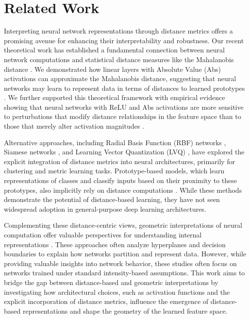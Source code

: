 \section{Related Work}
\label{sec:related_work}

Interpreting neural network representations through distance metrics offers a promising avenue for enhancing their interpretability and robustness. Our recent theoretical work has established a fundamental connection between neural network computations and statistical distance measures like the Mahalanobis distance \cite{mahalanobis1936generalized}. We demonstrated how linear layers with Absolute Value (Abs) activations can approximate the Mahalanobis distance, suggesting that neural networks may learn to represent data in terms of distances to learned prototypes \cite{oursland2024interpreting}. We further supported this theoretical framework with empirical evidence showing that neural networks with ReLU and Abs activations are more sensitive to perturbations that modify distance relationships in the feature space than to those that merely alter activation magnitudes \cite{oursland2024neural}. 

Alternative approaches, including Radial Basis Function (RBF) networks \cite{broomhead1988rbf}, Siamese networks \cite{bromley1994signature}, and Learning Vector Quantization (LVQ) \cite{kohonen1995learning}, have explored the explicit integration of distance metrics into neural architectures, primarily for clustering and metric learning tasks. Prototype-based models, which learn representations of classes and classify inputs based on their proximity to these prototypes, also implicitly rely on distance computations \cite{snell2017prototypical}. While these methods demonstrate the potential of distance-based learning, they have not seen widespread adoption in general-purpose deep learning architectures.

Complementing these distance-centric views, geometric interpretations of neural computation offer valuable perspectives for understanding internal representations \cite{montavon2018methods, samek2019explainable}. These approaches often analyze hyperplanes and decision boundaries to explain how networks partition and represent data. However, while providing valuable insights into network behavior, these studies often focus on networks trained under standard intensity-based assumptions. This work aims to bridge the gap between distance-based and geometric interpretations by investigating how architectural choices, such as activation functions and the explicit incorporation of distance metrics, influence the emergence of distance-based representations and shape the geometry of the learned feature space.

